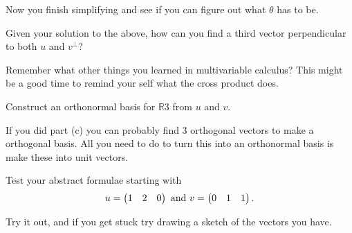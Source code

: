 {\begin{enumext}[label=\alph*,wrap-label=(#1)]
Now you finish simplifying and see if you can figure out what $\theta $ has to be.

\item Given your solution to the above, how can you find a third vector perpendicular to both $u$ and $v^\bot$?

Remember what other things you learned in multivariable calculus? This might be a good time to remind your self what the cross product does.

\item  Construct an orthonormal basis for $\mathbb{R}3$ from $u$ and $v$.

If you did part (c) you can probably find 3 orthogonal vectors to make a orthogonal basis. All you need to do to turn this into an orthonormal  basis is make these into unit vectors. 

\item  Test your abstract formulae starting with 
\[
u=\begin{pmatrix} 1 & 2 & 0 \end{pmatrix} \text{ and } v=\begin{pmatrix} 0 & 1 & 1 \end{pmatrix}.
\]

Try it out, and if you get stuck try drawing a sketch of the vectors you have.



\end{enumext}


} %


